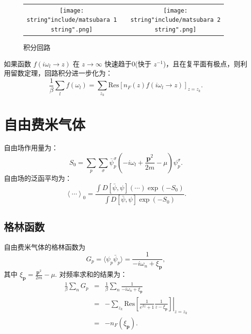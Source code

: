 \documentclass[10pt,UTF8]{ctexart}
\providecommand{\tabularnewline}{\\}
\begin{document}
\begin{figure}[H]
\begin{centering}
\begin{tabular}{ccc}
\texttt{[image: \\string"include/matsubara 1\\string".png]} &  & \texttt{[image: \\string"include/matsubara 2\\string".png]}\tabularnewline
\end{tabular}
\par\end{centering}
\caption{积分回路}
\end{figure}
\noindent
如果函数 $f\left(i\omega_{l}\rightarrow z\right)$ 在 $z\rightarrow \infty$ 快速趋于0(快于 $z^{-1}$)，且在复平面有极点，则利用留数定理，回路积分进一步化为：
\begin{equation}
	\frac{1}{\beta} \sum_{l}f\left(\omega_{l}\right)
	=\sum_{z_{k}} \mathrm{Res}\left[n_{F}(z) f\left(i\omega_{l}\rightarrow z\right)\right]_{z=z_k}.
\end{equation}



\section*{自由费米气体}
\noindent
自由场作用量为：
\begin{equation}
	S_{0}=\sum_{p}\sum_{\sigma}\bar{\psi}_{p}^{\sigma}\left(-i\omega_{l}+\frac{\bm{p}^{2}}{2m}-\mu\right)\psi_{p}^{\sigma}.
\end{equation}
自由场的泛函平均为：
\begin{equation}
	\left\langle \cdots\right\rangle _{0}=\frac{\int D\left[\bar{\psi},\psi\right]\left(\cdots\right)\exp\left(-S_{0}\right)}{\int D\left[\bar{\psi},\psi\right]\exp\left(-S_{0}\right)}.
\end{equation}


\subsection*{格林函数}
\noindent
自由费米气体的格林函数为
\begin{equation}
	G_{p} = \langle \psi_{p} \bar\psi_{p} \rangle = \frac{1}{-i\omega_n + \xi_{\bm p}},
\end{equation}
其中 $\xi_{\bm p}=\frac{\bm p^2}{2m}-\mu$. 对频率求和的结果为：
\begin{eqnarray}
	\frac{1}{\beta} \sum_{n} G_p & = & \frac{1}{\beta} \sum_{n}\frac{1}{-i\omega_n+\xi_{\bm p}}\\
 	& = & -\sum_{z_{k}} \left. \mathrm{Res}\left[\frac{1}{e^{\beta z}+1} \frac{1}{z-\xi_{\bm p}}\right]\right|_{z=z_{k}}\\
  	& = & - n_{F}(\xi_{\bm p}).
\end{eqnarray}
\end{document}
